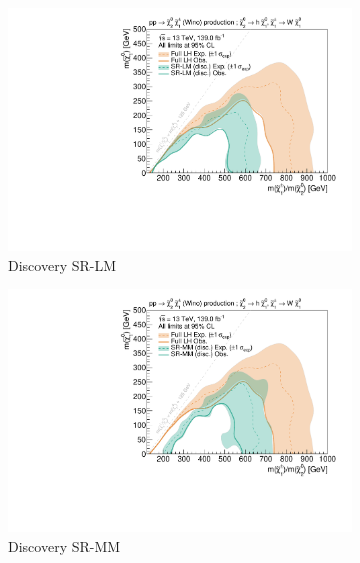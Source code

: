 \begin{figure}
	\centering
	\begin{subfigure}[b]{0.5\textwidth}
		\centering\includegraphics[width=\textwidth]{exclusion_1Lbb_SRLM_noLabel_v2}
		\caption{Discovery SR-LM\label{fig:single_bin_SRLM}}
	\end{subfigure}\hfill
	\begin{subfigure}[b]{0.5\textwidth}
		\centering\includegraphics[width=\textwidth]{exclusion_1Lbb_SRMM_noLabel_v2}
		\caption{Discovery SR-MM\label{fig:single_bin_SRMM}}
	\end{subfigure}\hfill
	\par\medskip
	\begin{subfigure}[b]{0.5\textwidth}

\end{subfigure}
\end{figure}
